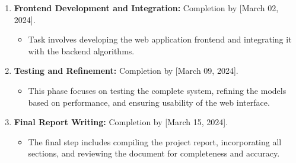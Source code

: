 \documentclass[11pt,a4paper]{article}
\begin{document}
\begin{enumerate}
    \item \textbf{Frontend Development and Integration:} Completion by [March 02, 2024].
    \begin{itemize}
        \item Task involves developing the web application frontend and integrating it with the backend algorithms.
    \end{itemize}
    
    \item \textbf{Testing and Refinement:} Completion by [March 09, 2024].
    \begin{itemize}
        \item This phase focuses on testing the complete system, refining the models based on performance, and ensuring usability of the web interface.
    \end{itemize}
    
    \item \textbf{Final Report Writing:} Completion by [March 15, 2024].
    \begin{itemize}
        \item The final step includes compiling the project report, incorporating all sections, and reviewing the document for completeness and accuracy.
    \end{itemize}
\end{enumerate}








\end{document}
